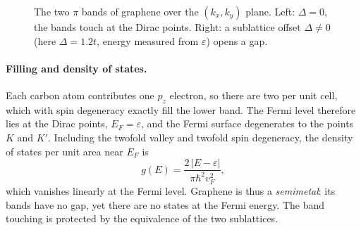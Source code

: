 \begin{figure}[ht]
\centering
{}
\hfill
{}
\caption{The two $\pi$ bands of graphene over the $(k_x,k_y)$ plane. Left: $\Delta=0$, the bands touch at the Dirac points. Right: a sublattice offset $\Delta\neq0$ (here $\Delta=1.2t$, energy measured from $\varepsilon$) opens a gap.}
\label{fig:graphene-bands}
\end{figure}

\paragraph{Filling and density of states.} Each carbon atom contributes one $p_z$ electron, so there are two per unit cell, which with spin degeneracy exactly fill the lower band. The Fermi level therefore lies at the Dirac points, $E_F=\varepsilon$, and the Fermi surface degenerates to the points $K$ and $K'$. Including the twofold valley and twofold spin degeneracy, the density of states per unit area near $E_F$ is
\begin{equation}
    g(E) = \frac{2\,|E-\varepsilon|}{\pi\hbar^2 v_F^2},
\end{equation}
which vanishes linearly at the Fermi level. Graphene is thus a \emph{semimetal}: its bands have no gap, yet there are no states at the Fermi energy. The band touching is protected by the equivalence of the two sublattices.

